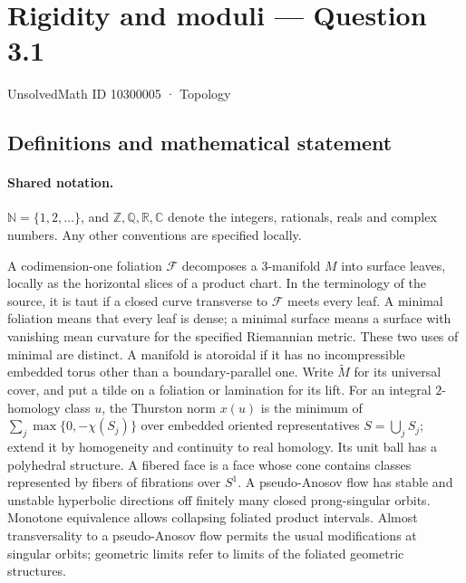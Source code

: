 \documentclass[11pt]{article}
\begin{document}
\setcounter{section}{10300004}
\section{Rigidity and moduli — Question 3.1}\label{10300005}
{\small\sffamily UnsolvedMath ID 10300005 · Topology}
\subsection{Definitions and mathematical statement}

\paragraph{Shared notation.}$\mathbb N=\{1,2,\ldots\}$, and $\mathbb Z,\mathbb Q,\mathbb R,\mathbb C$ denote the integers, rationals, reals and complex numbers. Any other conventions are specified locally.


A codimension-one foliation $\mathcal F$ decomposes a $3$-manifold $M$ into surface leaves, locally as the horizontal slices of a product chart. In the terminology of the source, it is taut if a closed curve transverse to $\mathcal F$ meets every leaf. A minimal foliation means that every leaf is dense; a minimal surface means a surface with vanishing mean curvature for the specified Riemannian metric. These two uses of minimal are distinct. A manifold is atoroidal if it has no incompressible embedded torus other than a boundary-parallel one. Write $\widetilde M$ for its universal cover, and put a tilde on a foliation or lamination for its lift. For an integral $2$-homology class $u$, the Thurston norm $x(u)$ is the minimum of $\sum_j\max\{0,-\chi(S_j)\}$ over embedded oriented representatives $S=\bigcup_j S_j$; extend it by homogeneity and continuity to real homology. Its unit ball has a polyhedral structure. A fibered face is a face whose cone contains classes represented by fibers of fibrations over $S^1$. A pseudo-Anosov flow has stable and unstable hyperbolic directions off finitely many closed prong-singular orbits. Monotone equivalence allows collapsing foliated product intervals. Almost transversality to a pseudo-Anosov flow permits the usual modifications at singular orbits; geometric limits refer to limits of the foliated geometric structures.
\end{document}
